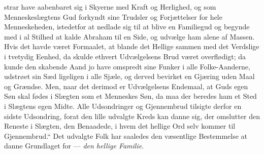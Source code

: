 \documentclass[12pt,a4paper]{book}
\begin{document}
strar have aabenbaret sig i Skyerne med Kraft og Herlighed, og som
Menneskeslægtens Gud forkyndt sine Trudsler og Forjættelser for hele
Menneskeheden, istedetfor at nedlade sig til at blive en Familiegud og begynde
med i al Stilhed at kalde Abraham til en Side, og udvælge ham alene af Massen.
Hvis det havde været Formaalet, at blande det Hellige sammen med det Verdslige i
tvetydig Eenhed, da skulde ethvert Udvælgelsens Brud været overflødigt; da kunde
den skabende Aand jo have omspredt sine Funker i alle Folke-Aanderne, udstrøet
sin Sæd ligeligen i alle Sjæle, og derved bevirket en Gjæring uden Maal og
Grændse. Men, naar det derimod er Udvælgelsens Endemaal, at Guds egen Søn skal
fødes i Slægten som et Menneskes Søn, da maa der beredes ham et Sted i Slægtens
egen Midte. Alle Udsondringer og Gjennembrud tilsigte derfor en sidste
Udsondring, forat den lille udvalgte Kreds kan danne sig, der omslutter den
Reneste i Slægten, den Benaadede, i hvem det hellige Ord selv kommer til
Gjennembrud.“ Det udvalgte Folk har saaledes den væsentlige Bestemmelse at danne
Grundlaget for --- \emph{den hellige Familie}.
\end{document}
